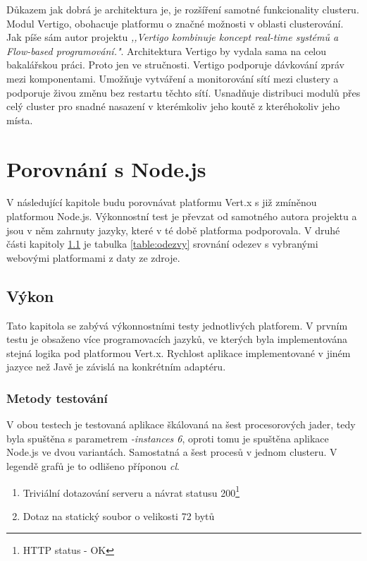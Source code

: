 Důkazem jak dobrá je architektura je, je rozšíření samotné funkcionality clusteru. Modul Vertigo\cite{vertigo}, obohacuje platformu o značné možnosti v oblasti clusterování. Jak píše sám autor projektu \emph{,,Vertigo kombinuje koncept real-time systémů a Flow-based programování."}. Architektura Vertigo by vydala sama na celou bakalářskou práci. Proto jen ve stručnosti. Vertigo podporuje dávkování zpráv mezi komponentami. Umožňuje vytváření a monitorování sítí mezi clustery a podporuje živou změnu bez restartu těchto sítí. Usnadňuje distribuci modulů přes celý cluster pro snadné nasazení v kterémkoliv jeho koutě z kteréhokoliv jeho místa.

\section{Porovnání s Node.js}

V následující kapitole budu porovnávat platformu Vert.x s již zmíněnou platformou Node.js. Výkonnostní test\cite{benchmarkTim} je převzat od samotného autora projektu a jsou v něm zahrnuty jazyky, které v té době platforma podporovala. V druhé části kapitoly \ref{sub:performence} je tabulka \ref{table:odezvy} srovnání odezev s vybranými webovými platformami z daty ze zdroje\cite{benchmark}.

\subsection{Výkon}\label{sub:performence}

Tato kapitola se zabývá výkonnostními testy jednotlivých platforem. V prvním testu je obsaženo více programovacích jazyků, ve kterých byla implementována stejná logika pod platformou Vert.x. Rychlost aplikace implementované v jiném jazyce než Javě je závislá na konkrétním adaptéru.

\subsubsection{Metody testování}

V obou testech je testovaná aplikace škálovaná na šest procesorových jader, tedy byla spuštěna s parametrem \emph{-instances 6}, oproti tomu je spuštěna aplikace Node.js ve dvou variantách. Samostatná a šest procesů v jednom clusteru. V legendě grafů je to odlišeno příponou \emph{cl}.

\begin{enumerate}
\item{Triviální dotazování serveru a návrat statusu 200\footnote{HTTP status - OK}}
\item{Dotaz na statický soubor o velikosti 72 bytů}
\end{enumerate}

